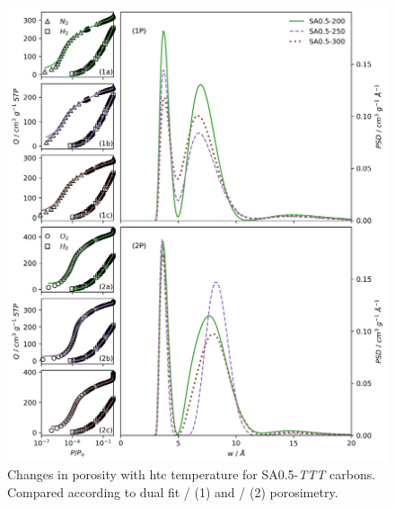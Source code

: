 \begin{appendices}
\begin{figure}[hptb]
    \centering
    \includegraphics[width=\columnwidth, keepaspectratio]{5-dual_isotherm/figs/SA050-xxx_isopsd.png}
    \caption{Changes in porosity with \gls{htc} temperature for SA0.5-\textit{TTT} carbons. Compared according to dual fit / (1) and / (2) porosimetry.}
    \label{fig:SA050-xxx_isopsd}
\end{figure}


\end{appendices}
